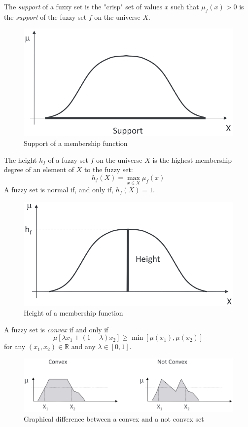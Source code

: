 \documentclass[12pt, a4paper]{report}
\newtheorem[style=M,bodystyle=\normalfont]{theorem}{Theorem}
\newtheorem[style=M,bodystyle=\normalfont]{corollary}{Corollary}
\newtheorem[style=M,bodystyle=\normalfont]{lemma}{Lemma}
\newtheorem[style=M,bodystyle=\normalfont]{definition}{Definition}
\begin{document}
    \begin{definition}[H]
        The \emph{support} of a fuzzy set is the "crisp" set of values $x$ such that $\mu_f(x)>0$ is the \emph{support} of the fuzzy set
        $f$ on the universe $X$.
    \end{definition}
    \begin{figure}[H]
        \centering
        \includegraphics[width=0.5\linewidth]{images/support.png}
        \caption{Support of a membership function}
    \end{figure}
    \begin{definition}
        The height $h_f$ of a fuzzy set $f$ on the universe $X$ is the highest membership degree of an element of $X$ to the fuzzy set:
        \[h_f(X)=\max_{x \in X}\mu_f(x)\]
        A fuzzy set is normal if, and only if, $h_f(X)=1$.
    \end{definition}
    \begin{figure}[H]
        \centering
        \includegraphics[width=0.5\linewidth]{images/height.png}
        \caption{Height of a membership function}
    \end{figure}
    \begin{definition}
        A fuzzy set is \emph{convex} if and only if 
        \[\mu[\lambda x_1+(1-\lambda)x_2] \geq \min [\mu(x_1),\mu(x_2)]\]
        for any $(x_1,x_2) \in \mathbb{R}$ and any $\lambda \in [0,1]$.
    \end{definition}
    \begin{figure}[H]
        \centering
        \includegraphics[width=0.75\linewidth]{images/convex.png}
        \caption{Graphical difference between a convex and a not convex set}
    \end{figure}
\end{document}
